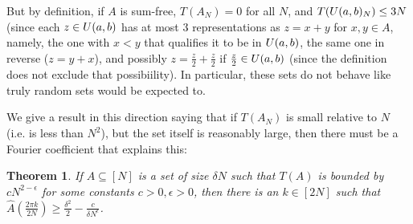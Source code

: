 \documentclass{report}
\newtheorem{theorem}{Theorem}[section]
\theoremstyle{remark}
\numberwithin{equation}{section}
\begin{document}
But by definition, if $A$ is sum-free, $T(A_N) = 0$ for all $N$, and
$T(U(a,b)_N) \leq 3N$ (since each $z \in U(a,b)$ has at most 3
representations as $z = x+y$ for $x,y \in A$, namely, the one with
$x < y$ that qualifies it to be in $U(a,b)$, the same one in
reverse ($z = y+x$), and possibly $z = \frac{z}{2} + \frac{z}{2}$ if
$\frac{z}{2} \in U(a,b)$ (since the definition does not exclude
that possibiility).  In particular, these sets do not behave like
truly random sets would be expected to.  

We give a result in this direction saying that if $T(A_N)$ is small
relative to $N$ (i.e. is less than $N^2$), but the set itself is
reasonably large, then there must be a Fourier coefficient that
explains this: 

\begin{theorem}\label{thm:alpha_finitary}
  If $A \subseteq [N]$ is a set of size $\delta N$ such that $T(A)$ is
  bounded by $c N^{2-\epsilon}$ for some constants
  $c > 0, \epsilon > 0$, then there is an $k \in [2N]$ such that
  $\widehat{A}(\frac{2\pi k}{2N}) \geq \frac{\delta^2}{2} - \frac{c}{\delta
    N^\epsilon}$.
\end{theorem}
\end{document}
